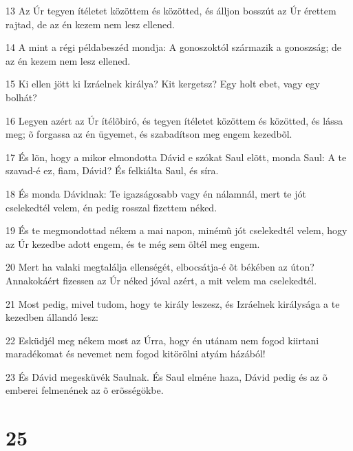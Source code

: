 \par 13 Az Úr tegyen ítéletet közöttem és közötted, és álljon bosszút az Úr érettem rajtad, de az én kezem nem lesz ellened.
\par 14 A mint a régi példabeszéd mondja: A gonoszoktól származik a gonoszság; de az én kezem nem lesz ellened.
\par 15 Ki ellen jött ki Izráelnek királya? Kit kergetsz? Egy holt ebet, vagy egy bolhát?
\par 16 Legyen azért az Úr ítélõbiró, és tegyen ítéletet közöttem és közötted, és lássa meg; õ forgassa az én ügyemet, és szabadítson meg engem kezedbõl.
\par 17 És lõn, hogy a mikor elmondotta Dávid e szókat Saul elõtt, monda Saul: A te szavad-é ez, fiam, Dávid? És felkiálta Saul, és síra.
\par 18 És monda Dávidnak: Te igazságosabb vagy én nálamnál, mert te jót cselekedtél velem, én pedig rosszal fizettem néked.
\par 19 És te megmondottad nékem a mai napon, minémû jót cselekedtél velem, hogy az Úr kezedbe adott engem, és te még sem öltél meg engem.
\par 20 Mert ha valaki megtalálja ellenségét, elbocsátja-é õt békében az úton? Annakokáért fizessen az Úr néked jóval azért, a mit velem ma cselekedtél.
\par 21 Most pedig, mivel tudom, hogy te király leszesz, és Izráelnek királysága a te kezedben állandó lesz:
\par 22 Esküdjél meg nékem most az Úrra, hogy én utánam nem fogod kiirtani maradékomat és nevemet nem fogod kitörölni atyám házából!
\par 23 És Dávid megesküvék Saulnak. És Saul elméne haza, Dávid pedig és az õ emberei felmenének az õ erõsségökbe.

\chapter{25}

